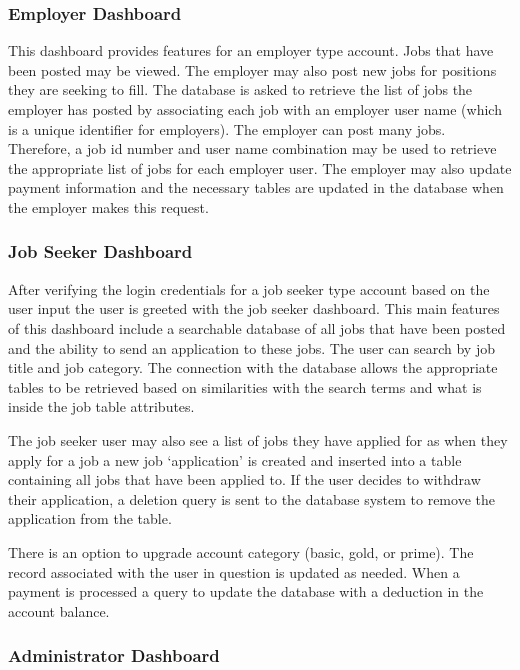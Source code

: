 \documentclass[11pt]{article}
\begin{document}
\subsubsection{Employer Dashboard}

This dashboard provides features for an employer type account. Jobs that have been posted may be viewed. The employer may also post new jobs for positions they are seeking to fill. The database is asked to retrieve the list of jobs the employer has posted by associating each job with an employer user name (which is a unique identifier for employers). The employer can post many jobs. Therefore, a job id number and user name combination may be used to retrieve the appropriate list of jobs for each employer user. The employer may also update payment information and the necessary tables are updated in the database when the employer makes this request.

\subsubsection{Job Seeker Dashboard}

After verifying the login credentials for a job seeker type account based on the user input the user is greeted with the job seeker dashboard. This main features of this dashboard include a searchable database of all jobs that have been posted and the ability to send an application to these jobs. The user can search by job title and job category. The connection with the database allows the appropriate tables to be retrieved based on similarities with the search terms and what is inside the job table attributes. \par 
The job seeker user may also see a list of jobs they have applied for as when they apply for a job a new job `application' is created and inserted into a table containing all jobs that have been applied to. If the user decides to withdraw their application, a deletion query is sent to the database system to remove the application from the table. \par 
There is an option to upgrade account category (basic, gold, or prime). The record associated with the user in question is updated as needed. When a payment is processed a query to update the database with a deduction in the account balance.

\subsubsection{Administrator Dashboard}
\end{document}
